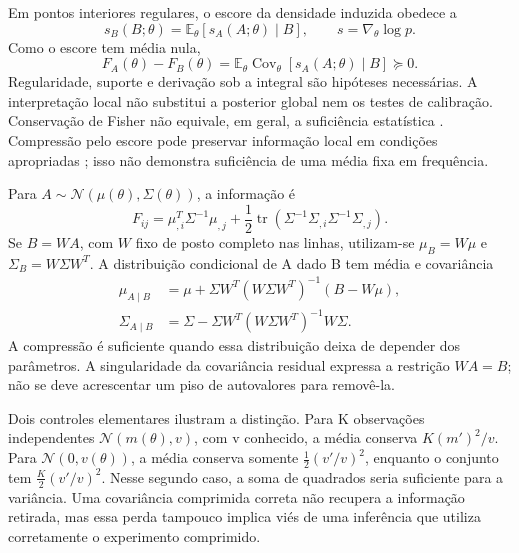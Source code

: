 Em pontos interiores regulares, o escore da densidade induzida obedece a
\begin{equation}
 s_B(B;\theta)=\mathbb E_\theta[s_A(A;\theta)\mid B],
 \qquad s=\nabla_\theta\log p.
 \label{eq:comp-escore}
\end{equation}
Como o escore tem média nula,
\begin{equation}
 F_A(\theta)-F_B(\theta)
 =\mathbb E_\theta\operatorname{Cov}_\theta[s_A(A;\theta)\mid B]
 \succeq0.
 \label{eq:comp-fisher}
\end{equation}
Regularidade, suporte e derivação sob a integral são hipóteses necessárias.
A interpretação local não substitui a posterior global nem os testes
de calibração. Conservação de Fisher não equivale, em geral, a suficiência
estatística \cite{pollard2012fisher}. Compressão pelo escore pode preservar
informação local em condições apropriadas \cite{alsing2018compression};
isso não demonstra suficiência de uma média fixa em frequência.

Para \(A\sim\mathcal N(\mu(\theta),\Sigma(\theta))\), a informação é
\begin{equation}
 F_{ij}=\mu_{,i}^{T}\Sigma^{-1}\mu_{,j}
       +\frac12\operatorname{tr}
       (\Sigma^{-1}\Sigma_{,i}\Sigma^{-1}\Sigma_{,j}).
 \label{eq:comp-fisher-normal}
\end{equation}
Se \(B=WA\), com \(W\) fixo de posto completo nas linhas, utilizam-se
\(\mu_B=W\mu\) e \(\Sigma_B=W\Sigma W^T\). A distribuição condicional
de A dado B tem média e covariância
\begin{align}
 \mu_{A\mid B}&=\mu+\Sigma W^T(W\Sigma W^T)^{-1}(B-W\mu),\nonumber\\
 \Sigma_{A\mid B}&=\Sigma-\Sigma W^T(W\Sigma W^T)^{-1}W\Sigma.
 \label{eq:comp-condicional-normal}
\end{align}
A compressão é suficiente quando essa distribuição deixa de depender dos
parâmetros. A singularidade da covariância residual expressa a restrição
\(WA=B\); não se deve acrescentar um piso de autovalores para removê-la.

Dois controles elementares ilustram a distinção. Para K observações
independentes \(\mathcal N(m(\theta),v)\), com v conhecido, a média conserva
\(K(m')^2/v\). Para \(\mathcal N(0,v(\theta))\), a média conserva somente
\(\tfrac12(v'/v)^2\), enquanto o conjunto tem
\(\tfrac K2(v'/v)^2\). Nesse segundo caso, a soma de quadrados seria
suficiente para a variância. Uma covariância comprimida correta não recupera
a informação retirada, mas essa perda tampouco implica viés de uma inferência
que utiliza corretamente o experimento comprimido.

